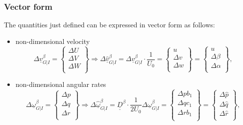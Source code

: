 \subsubsection{Vector form}
The quantities just defined can be expressed in vector form as follows:
\begin{itemize}
    \item  non-dimensional velocity
    \begin{equation}
        \Delta \underline{v}_{G|I}^\beta  = \begin{Bmatrix}
            \Delta U\\
            \Delta V\\
            \Delta W\\
        \end{Bmatrix} \Rightarrow 
        \Delta \underline{\hat{v}}_{G|I}^\beta  = \Delta \underline{v}_{G|I}^\beta \cdot \frac{1}{U_0} =\begin{Bmatrix}
            u\\
            \Delta v\\
            \Delta w\\
        \end{Bmatrix}=\begin{Bmatrix}
            u\\
            \Delta \beta\\
            \Delta \alpha\\
        \end{Bmatrix},
    \end{equation}
    
    \item non-dimensional angular rates
    \begin{equation}
        \Delta \underline{\omega}_{G|I}^\beta  = \begin{Bmatrix}
            \Delta p\\
            \Delta q\\
            \Delta r\\
        \end{Bmatrix} \Rightarrow 
        \Delta \underline{\hat{\omega}}_{G|I}^\beta  = \underline{\underline{D}}^\beta \cdot \frac{1}{2U_0}\Delta \underline{\omega}_{G|I}^\beta  =\begin{Bmatrix}
            \Delta p b_1\\
            \Delta q c_1\\
            \Delta r b_1\\
        \end{Bmatrix}=\begin{Bmatrix}
            \Delta \hat{p}\\
            \Delta \hat{q}\\
            \Delta \hat{r}\\
        \end{Bmatrix},
    \end{equation}


\end{itemize}
